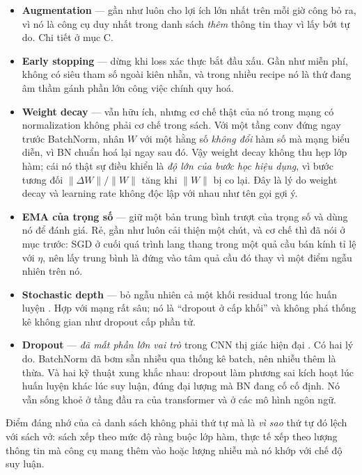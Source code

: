 \documentclass[../../../deep_learning.tex]{subfiles}
\begin{document}
\begin{itemize}
\item \textbf{Augmentation} --- gần như luôn cho lợi ích lớn nhất trên mỗi giờ công bỏ ra, vì nó là công cụ duy nhất trong danh sách \emph{thêm} thông tin thay vì lấy bớt tự do. Chi tiết ở mục C.
\item \textbf{Early stopping} --- dừng khi loss xác thực bắt đầu xấu. Gần như miễn phí, không có siêu tham số ngoài kiên nhẫn, và trong nhiều recipe nó là thứ đang âm thầm gánh phần lớn công việc chính quy hoá.
\item \textbf{Weight decay} --- vẫn hữu ích, nhưng cơ chế thật của nó trong mạng có normalization không phải cơ chế trong sách. Với một tầng conv đứng ngay trước BatchNorm, nhân \(W\) với một hằng số \emph{không đổi} hàm số mà mạng biểu diễn, vì BN chuẩn hoá lại ngay sau đó. Vậy weight decay không thu hẹp lớp hàm; cái nó thật sự điều khiển là \emph{độ lớn của bước học hiệu dụng}, vì bước tương đối \(\|\Delta W\|/\|W\|\) tăng khi \(\|W\|\) bị co lại. Đây là lý do weight decay và learning rate không độc lập với nhau như tên gọi gợi ý.
\item \textbf{EMA của trọng số} --- giữ một bản trung bình trượt của trọng số và dùng nó để đánh giá. Rẻ, gần như luôn cải thiện một chút, và cơ chế thì đã nói ở mục trước: SGD ở cuối quá trình lang thang trong một quả cầu bán kính tỉ lệ với \(\eta\), nên lấy trung bình là đứng vào tâm quả cầu đó thay vì một điểm ngẫu nhiên trên nó.
\item \textbf{Stochastic depth} --- bỏ ngẫu nhiên cả một khối residual trong lúc huấn luyện \cite{huang2016stochastic}. Hợp với mạng rất sâu; nó là ``dropout ở cấp khối'' và không phá thống kê không gian như dropout cấp phần tử.
\item \textbf{Dropout} --- \emph{đã mất phần lớn vai trò} trong CNN thị giác hiện đại \cite{srivastava2014dropout}. Có hai lý do. BatchNorm đã bơm sẵn nhiễu qua thống kê batch, nên nhiễu thêm là thừa. Và hai kỹ thuật xung khắc nhau: dropout làm phương sai kích hoạt lúc huấn luyện khác lúc suy luận, đúng đại lượng mà BN đang cố cố định. Nó vẫn sống khoẻ ở tầng đầu ra của transformer và ở các mô hình ngôn ngữ.
\end{itemize}

Điểm đáng nhớ của cả danh sách không phải thứ tự mà là \emph{vì sao} thứ tự đó lệch với sách vở: sách xếp theo mức độ ràng buộc lớp hàm, thực tế xếp theo lượng thông tin mà công cụ mang thêm vào hoặc lượng nhiễu mà nó khớp với chế độ suy luận.
\end{document}
